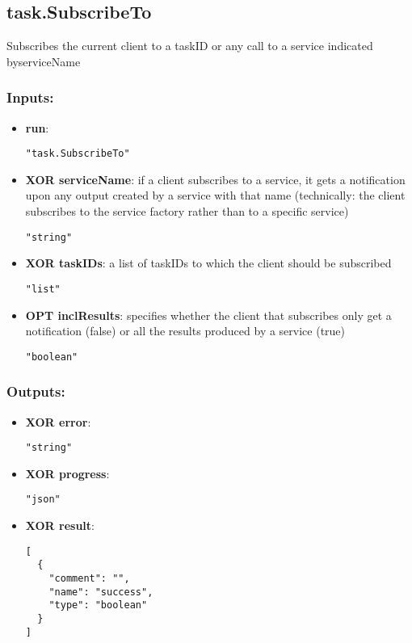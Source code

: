 \subsection{task.SubscribeTo}
Subscribes the current client to a taskID or any call to a service indicated byserviceName
\subsubsection*{Inputs:}
\begin{itemize}
    \item \textbf{run}: 
\begin{lstlisting}
"task.SubscribeTo"
\end{lstlisting}
    \item \textbf{XOR serviceName}: if a client subscribes to a service, it gets a notification upon any  output created by a service with that name (technically: the client  subscribes to the service factory rather than to a specific service)
\begin{lstlisting}
"string"
\end{lstlisting}
    \item \textbf{XOR taskIDs}: a list of taskIDs to which the client should be subscribed
\begin{lstlisting}
"list"
\end{lstlisting}
    \item \textbf{OPT inclResults}: specifies whether the client that subscribes only get a notification (false) or all the results produced by a service (true)
\begin{lstlisting}
"boolean"
\end{lstlisting}
  \end{itemize}

\subsubsection*{Outputs:}
\begin{itemize}
    \item \textbf{XOR error}: 
\begin{lstlisting}
"string"
\end{lstlisting}
    \item \textbf{XOR progress}: 
\begin{lstlisting}
"json"
\end{lstlisting}
    \item \textbf{XOR result}: 
\begin{lstlisting}
[
  {
    "comment": "", 
    "name": "success", 
    "type": "boolean"
  }
]
\end{lstlisting}
  \end{itemize}

